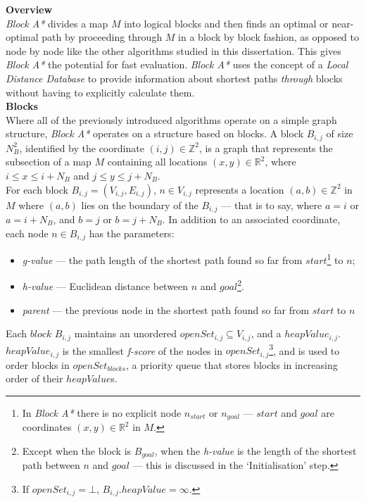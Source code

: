 \documentclass[12pt,notitlepage]{report}
\begin{document}
\noindent
{\bfseries Overview}\\
\noindent
{\em Block A*} divides a map $M$ into logical blocks and then finds an optimal or near-optimal path by proceeding through $M$ in a block by block fashion, as opposed to node by node like the other algorithms studied in this dissertation. This gives {\em Block A*} the potential for fast evaluation. {\em Block A*} uses the concept of a {\em Local Distance Database} to provide information about shortest paths {\em through} blocks without having to explicitly calculate them.\\

\noindent
{\bfseries Blocks}\\
\noindent
Where all of the previously introduced algorithms operate on a simple graph structure, {\em Block A*} operates on a structure based on blocks. A block $B_{i,j}$ of size $N_{B}^{2}$, identified by the coordinate $(i,j) \in \mathbb{Z}^{2}$, is a graph that represents the subsection of a map $M$ containing all locations $(x,y) \in \mathbb{R}^{2}$, where $i \leq x \leq i+N_{B}$ and $j \leq y \leq j+N_{B}$.\\

\noindent
For each block $B_{i,j} = (V_{i,j},E_{i,j})$, $n \in V_{i,j}$ represents a location $(a,b) \in \mathbb{Z}^{2}$ in $M$ where $(a,b)$ lies on the boundary of the $B_{i,j}$ --- that is to say, where $a=i$ or $a=i+N_{B}$, and $b=j$ or $b=j+N_{B}$. In addition to an associated coordinate, each node $n \in B_{i,j}$ has the parameters:
\begin{itemize}
\item {\em g-value} --- the path length of the shortest path found so far from $start$\footnote{In {\em Block A*} there is no explicit node $n_{start}$ or $n_{goal}$ --- $start$ and $goal$ are coordinates $(x,y) \in \mathbb{R}^{2}$ in $M$.} to $n$;
\item {\em h-value} --- Euclidean distance between $n$ and $goal$\footnote{Except when the block is $B_{goal}$, when the {\em h-value} is the length of the shortest path between $n$ and $goal$ --- this is discussed in the `Initialisation' step.}. 
\item {\em parent} --- the previous node in the shortest path found so far from $start$ to $n$
\end{itemize}

\noindent
Each $block$ $B_{i,j}$ maintains an unordered $openSet_{i,j} \subseteq V_{i,j}$, and a $heapValue_{i,j}$. $heapValue_{i,j}$ is the smallest {\em f-score} of the nodes in $openSet_{i,j}$\footnote{If $openSet_{i,j} = \bot$, $B_{i,j}.heapValue = \infty$.}, and is used to order blocks in $openSet_{blocks}$, a priority queue that stores blocks in increasing order of their $heapValue$s.\\
\end{document}
